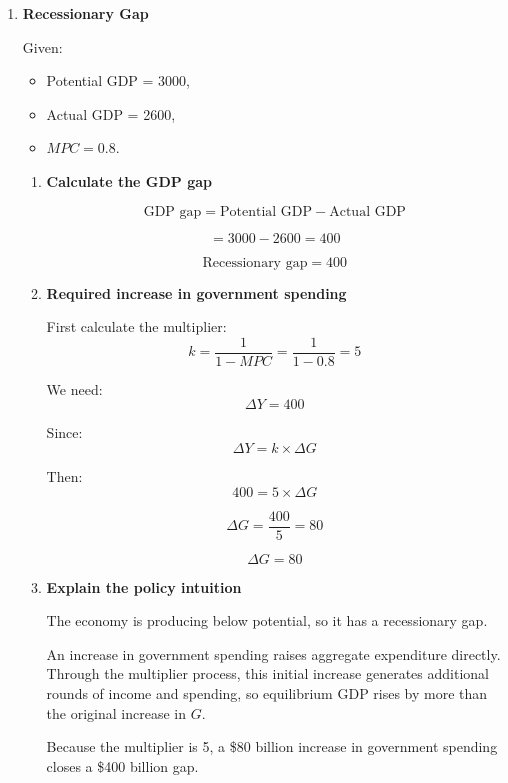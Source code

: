 \documentclass[12pt]{article}
\begin{document}
\begin{enumerate}[label=\textbf{\arabic*.}, start=11]

\newpage

\item \textbf{Recessionary Gap}

Given:
\begin{itemize}
    \item Potential GDP = 3000,
    \item Actual GDP = 2600,
    \item \(MPC = 0.8\).
\end{itemize}

\begin{enumerate}
    \item[(a)] \textbf{Calculate the GDP gap}

\[
\text{GDP gap} = \text{Potential GDP} - \text{Actual GDP}
\]

\[
= 3000 - 2600 = 400
\]

\[
\boxed{\text{Recessionary gap} = 400}
\]

\item[(b)] \textbf{Required increase in government spending}

First calculate the multiplier:
\[
k = \frac{1}{1-MPC} = \frac{1}{1-0.8} = 5
\]

We need:
\[
\Delta Y = 400
\]

Since:
\[
\Delta Y = k \times \Delta G
\]

Then:
\[
400 = 5 \times \Delta G
\]

\[
\Delta G = \frac{400}{5} = 80
\]

\[
\boxed{\Delta G = 80}
\]

\item[(c)] \textbf{Explain the policy intuition}

The economy is producing below potential, so it has a recessionary gap.

An increase in government spending raises aggregate expenditure directly. Through the multiplier process, this initial increase generates additional rounds of income and spending, so equilibrium GDP rises by more than the original increase in \(G\).

Because the multiplier is 5, a \$80 billion increase in government spending closes a \$400 billion gap.

\end{enumerate}

\end{enumerate}
\end{document}
